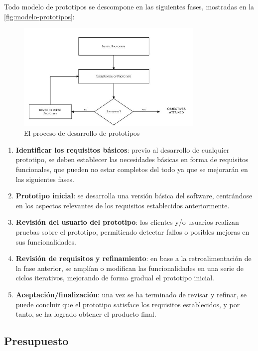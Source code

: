 Todo modelo de prototipos se descompone en las siguientes fases, mostradas en la \autoref{fig:modelo-prototipos}:

\begin{figure}[H]
	\centering
	\includegraphics[width=0.8\textwidth]{imgs/modelo-prototipos.JPG}
	\caption{El proceso de desarrollo de prototipos \parencite{carr1997prototyping}}
	\label{fig:modelo-prototipos}
\end{figure}

\begin{enumerate}
    \item \textbf{Identificar los requisitos básicos}: previo al desarrollo de cualquier prototipo, se deben establecer las necesidades básicas en forma de requisitos funcionales, que pueden no estar completos del todo ya que se mejorarán en las siguientes fases.
    \item \textbf{Prototipo inicial}: se desarrolla una versión básica del software, centrándose en los aspectos relevantes de los requisitos establecidos anteriormente.
    \item \textbf{Revisión del usuario del prototipo}: los clientes y/o usuarios realizan pruebas sobre el prototipo, permitiendo detectar fallos o posibles mejoras en sus funcionalidades.
    \item \textbf{Revisión de requisitos y refinamiento}: en base a la retroalimentación de la fase anterior, se amplían o modifican las funcionalidades en una serie de ciclos iterativos, mejorando de forma gradual el prototipo inicial.
    \item \textbf{Aceptación/finalización}: una vez se ha terminado de revisar y refinar, se puede concluir que el prototipo satisface los requisitos establecidos, y por tanto, se ha logrado obtener el producto final.
\end{enumerate}


\subsection{Presupuesto}

